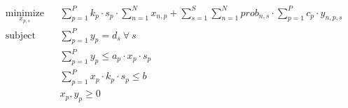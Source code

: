 \documentclass[10pt]{amsart}
\begin{document}
\begin{equation*}
\begin{aligned}
& \underset{x_{p,s}}{\text{minimize}} & & \sum_{p=1}^{P} k_{p}\cdot s_{p}\cdot \sum_{n=1}^{N} x_{n,p} + \sum_{s=1}^{S} \sum_{n=1}^{N} prob_{n,s} \cdot \sum_{p=1}^{P} c_{p}\cdot y_{n,p,s} \\
& \text{subject to} & & \sum_{p=1}^{P} y_{p} = d_{s} \ \forall \ s \\
& &&\sum_{p=1}^{P} y_{p} \leq a_{p}\cdot x_{p}\cdot s_{p}\\
& &&\sum_{p=1}^{P} x_{p}\cdot k_{p} \cdot s_{p} \leq b \\
& && x_{p}, y_{p} \geq 0
\end{aligned}
\end{equation*}
\end{document}
